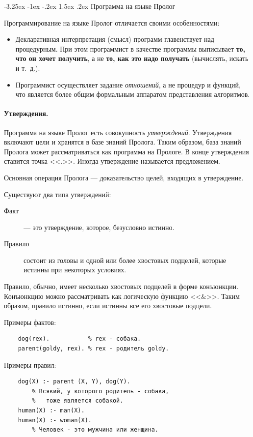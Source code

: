 \documentclass[12pt, openany, twoside]{book} %
\makeatletter
\renewcommand\section{\@startsection {section}{1}{\z@}%
                                   {-3.25ex \@plus -1ex \@minus -.2ex}%
                                   {1.5ex \@plus.2ex}%
                                   {\normalfont\large\bfseries}}
\makeatother
\begin{document}
\section{Программа на языке Пролог}

Программирование на языке Пролог отличается своими особенностями:
\begin{itemize}
\item Декларативная интерпретация (смысл) программ главенствует над процедурным. При этом  программист в качестве программы выписывает {\bf то, что он хочет получить}, а не  {\bf то, как это надо получать} (вычислять, искать и т.~д.).
\item Программист осуществляет задание \emph{отношений}, а не {процедур и функций}, что является более общим формальным аппаратом представления алгоритмов.
\end{itemize}

\paragraph{Утверждения.} Программа на языке Пролог есть совокупность \emph{ут\-вер\-жде\-ний}. Утверждения включают цели и хранятся в базе знаний Пролога. Таким образом, база знаний Пролога может рассматриваться как программа на Прологе. В конце утверждения ставится точка <<.>>. Иногда утверждение называется предложением.

Основная операция Пролога --- доказательство целей, входящих в утверждение.

Существуют два типа утверждений:
\begin{description}
\item[Факт] --- это утверждение, которое, безусловно истинно.
\item[Правило] состоит из головы и одной или более хвостовых подцелей, которые истинны при некоторых условиях.
\end{description}

Правило, обычно, имеет несколько хвостовых подцелей в форме конъюнкции. Конъюнкцию можно рассматривать как логическую функцию <<\&>>. Таким образом, правило истинно, если истинны все его хвостовые подцели.

Примеры фактов:
{\tt\begin{verbatim}
    dog(rex).           % rex - собака.
    parent(goldy, rex). % rex - родитель goldy.
\end{verbatim}}

Примеры правил:
{\tt\begin{verbatim}
    dog(X) :- parent (X, Y), dog(Y).
        % Всякий, у которого родитель - собака,
        %   тоже является собакой.
    human(Х) :- man(Х).
    human(Х) :- woman(Х).
        % Человек - это мужчина или женщина.
\end{verbatim}}
\end{document}
